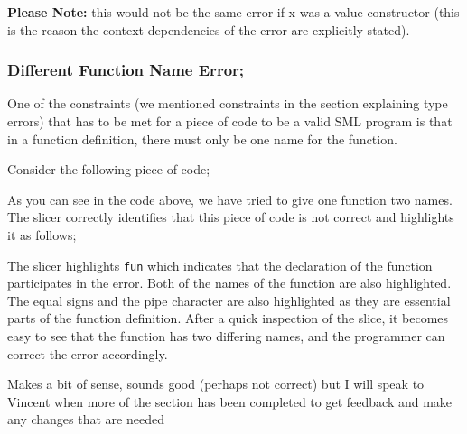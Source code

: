 \documentclass{report}
\begin{document}
\begin{itemize}
\textbf{Please Note:} this would not be the same error if x was a value
constructor (this is the reason the context dependencies of the error are
explicitly stated).


\vspace{0.5in}


\subsubsection{Different Function Name Error;}

  \subitem One of the constraints (we mentioned constraints in the
  section explaining type errors) that has to be met for a piece of
  code to be a valid SML program is that in a function definition,
  there must only be one name for the function.

Consider the following piece of code;


As you can see in the code above, we have tried to give one function
two names. The slicer correctly identifies that this piece of code is
not correct and highlights it as follows;


The slicer highlights \texttt{fun} which indicates that the
declaration of the function participates in the error. Both of the
names of the function are also highlighted. The equal signs and the
pipe character are also highlighted as they are essential parts of the
function definition. After a quick inspection of the slice, it becomes
easy to see that the function has two differing names, and the
programmer can correct the error accordingly.


{Makes a bit of sense, sounds good (perhaps not
  correct) but I will speak to Vincent when more of the section has
  been completed to get feedback and make any changes that are needed}


\newpage


\end{itemize}
\end{document}

